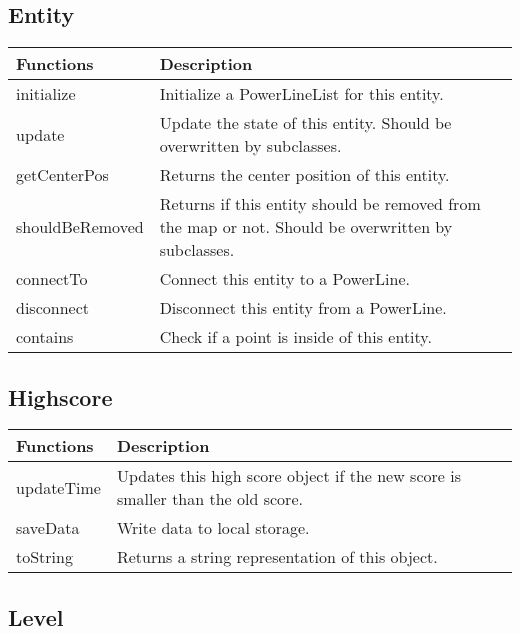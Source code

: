 \subsection*{Entity}
	\begin{table}[H]
	\begin{tabular}{p{4cm} | p{8cm} }
	\hline
	\rowcolor{gray}
	Functions & Description \\ \hline
	initialize & Initialize a PowerLineList for this entity. \\ \hline
	update & Update the state of this entity. Should be overwritten by subclasses. \\ \hline
	getCenterPos & Returns the center position of this entity. \\ \hline
	shouldBeRemoved & Returns if this entity should be removed from the map or not. Should be overwritten by subclasses. \\ \hline
	connectTo & Connect this entity to a PowerLine. \\ \hline
	disconnect & Disconnect this entity from a PowerLine. \\ \hline
	contains & Check if a point is inside of this entity. \\ \hline
	\end{tabular}
	\end{table}

\subsection*{Highscore}
	\begin{table}[H]
	\begin{tabular}{p{4cm} | p{8cm} }
	\hline
	\rowcolor{gray}
	Functions & Description \\ \hline
	updateTime & Updates this high score object if the new score is smaller than the old score. \\ \hline
	saveData & Write data to local storage. \\ \hline
	toString & Returns a string representation of this object. \\ \hline
	\end{tabular}
	\end{table}
	
\subsection*{Level}

